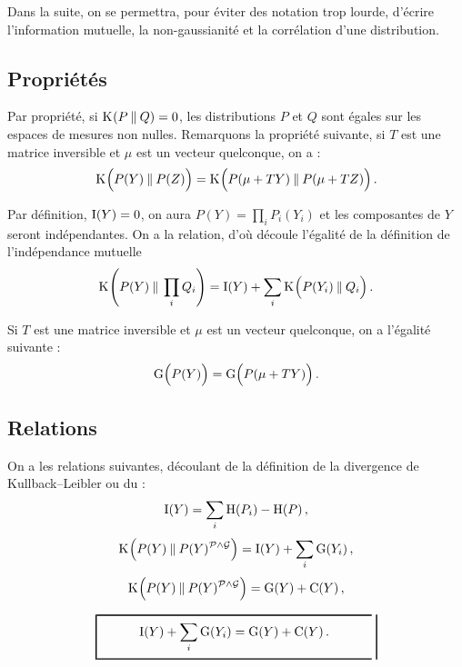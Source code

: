 \documentclass[a4paper]{article}
\newcommand{\Kl}[3][]{\mathrm K_{#1}\!\zp{#2\:\|\:#3}}
\newcommand{\zZ}[2]{\mathrm #1\!\zp{#2}}
\newcommand{\zD}{\mathcal}
\begin{document}
Dans la suite, on se permettra, pour éviter des notation trop lourde, d'écrire l'information mutuelle, la non-gaussianité et la corrélation d'une distribution.


\subsection{Propriétés}

Par propriété, si $\Kl PQ=0$, les distributions $P$ et $Q$  sont égales sur les espaces de mesures non nulles.
Remarquons la propriété suivante, si $T$ est une matrice inversible et $\mu$ est un vecteur quelconque, on a :
\begin{equation}
  \Kl{\zpbig2P(Y)}{P(Z)} = \Kl{\zpbig2P(\mu+TY)}{P(\mu+TZ)}.
\end{equation}\znl

Par définition, $\zZ IY = 0$, on aura $P(Y) = \prod_i P_i(Y_i)$ et les composantes de $Y$ seront indépendantes.
On a la relation, d'où découle l'égalité de la définition de l'indépendance mutuelle \[
\Kl{P(Y)}{\zpbig2\prod_iQ_i} = \zZ IY + \sum_i \Kl{\zpbig2P(Y_i)}{Q_i}.
\]

Si $T$ est une matrice inversible et $\mu$ est un vecteur quelconque, on a l'égalité suivante :
\begin{equation}
  \zZ G{\zpbig2P(Y)} = \zZ G{\zpbig2P(\mu+TY)}.
\end{equation}


\subsection{Relations}

On a les relations suivantes, découlant de la définition de la divergence de Kullback--Leibler ou du  :
\begin{equation}
  \zZ IY = \sum_i \zZ H{P_i} - \zZ H{P},
\end{equation}
\[
\Kl{\zpbig2 P(Y)}{P(Y)^{\zD P\wedge\zD G}} = \zZ IY + \sum_i \zZ G{Y_i},
\]
\[
\Kl{\zpbig2 P(Y)}{P(Y)^{\zD P\wedge\zD G}} = \zZ GY + \zZ CY,
\]

\begin{equation}
        \zfbox{1pt}{5pt}{$\displaystyle\kern1cm\zZ IY + \sum_i\zZ G{Y_i} = \zZ GY + \zZ CY.\kern1cm$}\label{eqn:1}
\end{equation}
\end{document}
